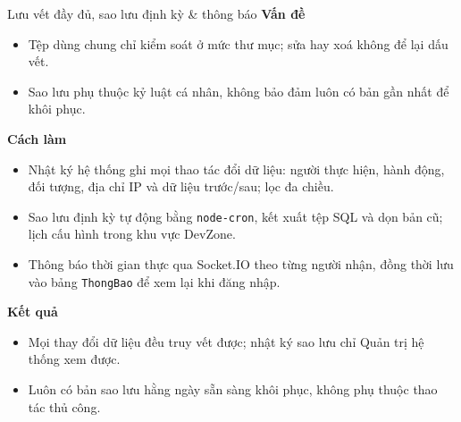 \documentclass[aspectratio=43,xcolor=table]{beamer}
\begin{document}
\begin{frame}{Lưu vết đầy đủ, sao lưu định kỳ \& thông báo}
  \footnotesize
  \textbf{\textcolor{hustred}{Vấn đề}}
  \begin{itemize}\scriptsize
    \item Tệp dùng chung chỉ kiểm soát ở mức thư mục; sửa hay xoá không để lại dấu vết.
    \item Sao lưu phụ thuộc kỷ luật cá nhân, không bảo đảm luôn có bản gần nhất để khôi phục.
  \end{itemize}

  \textbf{\textcolor{hustred}{Cách làm}}
  \begin{itemize}\scriptsize
    \item Nhật ký hệ thống ghi mọi thao tác đổi dữ liệu: người thực hiện, hành động, đối tượng, địa chỉ IP và dữ liệu trước/sau; lọc đa chiều.
    \item Sao lưu định kỳ tự động bằng \texttt{node-cron}, kết xuất tệp SQL và dọn bản cũ; lịch cấu hình trong khu vực DevZone.
    \item Thông báo thời gian thực qua Socket.IO theo từng người nhận, đồng thời lưu vào bảng \texttt{ThongBao} để xem lại khi đăng nhập.
  \end{itemize}

  \textbf{\textcolor{hustred}{Kết quả}}
  \begin{itemize}\scriptsize
    \item Mọi thay đổi dữ liệu đều truy vết được; nhật ký sao lưu chỉ Quản trị hệ thống xem được.
    \item Luôn có bản sao lưu hằng ngày sẵn sàng khôi phục, không phụ thuộc thao tác thủ công.
  \end{itemize}
\end{frame}
\end{document}
